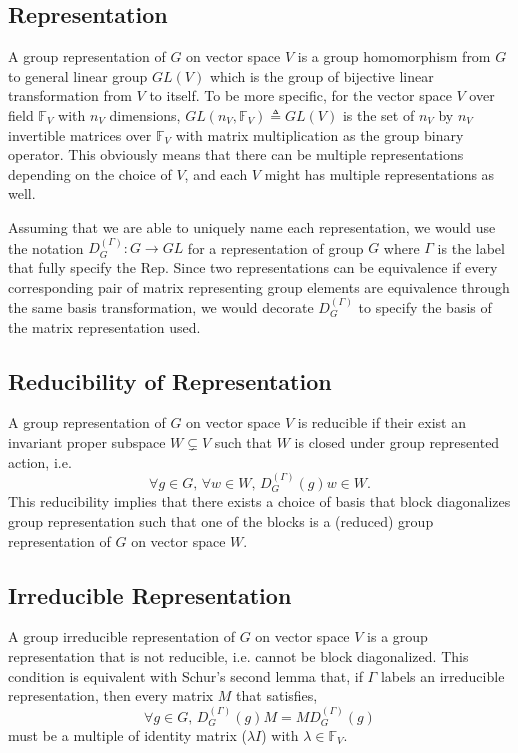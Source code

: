 \documentclass[preprint, 12pt]{revtex4-2}
\numberwithin{equation}{section}
\begin{document}
\subsection{Representation}
A group representation of $G$ on vector space $V$ is a group homomorphism from $G$ to general linear group $GL(V)$ which is the group of bijective linear transformation from $V$ to itself. To be more specific, for the vector space $V$ over field $\mathbb{F}_V$ with $n_V$ dimensions, $GL(n_V, \mathbb{F}_V)\triangleq GL(V)$ is the set of $n_V$ by $n_V$ invertible matrices over $\mathbb{F}_V$ with matrix multiplication as the group binary operator. This obviously means that there can be multiple representations depending on the choice of $V$, and each $V$ might has multiple representations as well. 

Assuming that we are able to uniquely name each representation, we would use the notation $D_{G}^{(\Gamma)}:G\rightarrow GL$ for a representation of group $G$ where $\Gamma$ is the label that fully specify the Rep. Since two representations can be equivalence if every corresponding pair of matrix representing group elements are equivalence through the same basis transformation, we would decorate $D_{G}^{(\Gamma)}$ to specify the basis of the matrix representation used.

\subsection{Reducibility of Representation}
A group representation of $G$ on vector space $V$ is reducible if their exist an invariant proper subspace $W\subsetneq V$ such that $W$ is closed under group represented action, i.e.
\begin{equation}\label{eq:invariant subspace}
    \forall g\in G,\,\forall w\in W,\, D_{G}^{(\Gamma)}(g)w\in W.
\end{equation}
This reducibility implies that there exists a choice of basis that block diagonalizes group representation such that one of the blocks is a (reduced) group representation of $G$ on vector space $W$.

\subsection{Irreducible Representation}
A group irreducible representation of $G$ on vector space $V$ is a group representation that is not reducible, i.e. cannot be block diagonalized. This condition is equivalent with Schur's second lemma that, if $\Gamma$ labels an irreducible representation, then every matrix $M$ that satisfies,
\begin{equation}\label{eq:Schur's 2nd lemma}
    \forall g\in G,\,D_{G}^{(\Gamma)}(g)M=MD_{G}^{(\Gamma)}(g)
\end{equation}
must be a multiple of identity matrix ($\lambda I$) with $\lambda\in \mathbb{F}_V$.
\end{document}
